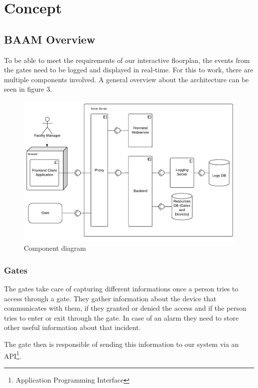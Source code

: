 \section{Concept}


\subsection{BAAM Overview}

To be able to meet the requirements of our interactive floorplan, the events from the gates need to be logged and displayed in real-time. For this to work, there are multiple components involved. A general overview about the architecture can be seen in figure 3.

\begin{figure}[!hb]
	\centering
	\includegraphics[width=1\linewidth]{images/Komponentendiagramm}
	\caption{Component diagram}
	\label{fig:Komponentendiagramm}
\end{figure}

\subsubsection{Gates}
\label{Gates}

The gates take care of capturing different informations once a person tries to access through a gate. They gather information about the device that communicates with them, if they granted or denied the access and if the person tries to enter or exit through the gate. In case of an alarm they need to store other useful information about that incident.

The gate then is responsible of sending this information to our system via an API\footnote{Application Programming Interface}.


